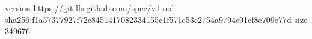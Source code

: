 version https://git-lfs.github.com/spec/v1
oid sha256:f1a57377927f72c8451417082334155c1f571e53c2754a9794c91cf8e709e77d
size 349676
